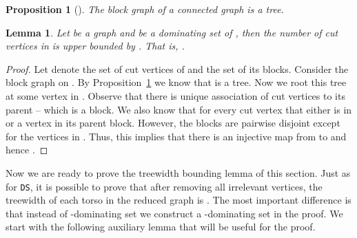 \documentclass[11pt]{article}
\newtheorem{proposition}{Proposition}
\newtheorem{lemma}{Lemma}
\newcommand{\tDS}{{\texttt{\sc DS}}}
\begin{document}
\begin{proposition}[\cite{diestelbook}] 
\label{prop:blockgraphtree}
The block graph of a connected graph is a tree.
\end{proposition}

 \begin{lemma}
 \label{lem:cutvertexcount}
 Let  be a graph and  be a dominating set of , then the number of cut vertices in  is upper bounded by . That is, . 
 \end{lemma} 
\begin{proof}
Let  denote the set of cut vertices of  and  the set of its blocks. Consider the block graph  on . By Proposition~\ref{prop:blockgraphtree} we know that  is a tree. Now we root this tree at some vertex in . Observe that there is unique association of cut vertices to its parent -- which is a block.  
We also know that for every  cut vertex  that either  is in  or a vertex in its parent  block. However, the blocks are pairwise disjoint except for the vertices in . Thus, this implies that there is an injective map from  to  and hence . 
\end{proof}

Now we are ready to prove the treewidth bounding lemma of this section. 
 Just as for \tDS, it is possible to prove that after removing all irrelevant vertices, the treewidth of each torso in the reduced graph is . The most important difference is that instead of -dominating set we construct a -dominating set in the proof.   We start with the following auxiliary lemma that will be useful for the proof. 

 
\end{document}
